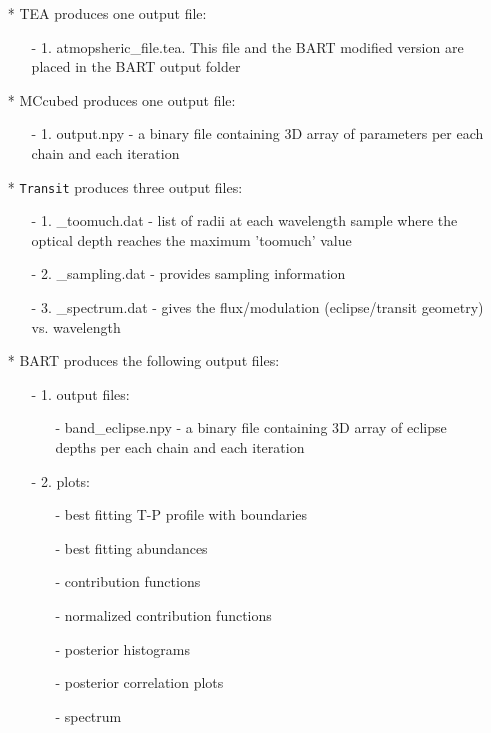 \documentclass[letterpaper, 12pt]{article}
\begin{document}
\begin{enumerate}

\item[*]TEA produces one output file:
\begin{enumerate}
\item[-]1. atmopsheric\_file.tea. This file and the BART modified version are placed in the BART output folder
\end{enumerate}

\item[*] MCcubed produces one output file:
\begin{enumerate}
\item[-]1. output.npy - a binary file containing 3D array of parameters per each chain and each iteration
\end{enumerate}

\item[*]{\tt Transit} produces three output files:
\begin{enumerate}
\item[-]1. \_toomuch.dat - list of radii at each wavelength sample where the optical depth reaches the maximum 'toomuch' value

\item[-]2. \_sampling.dat - provides sampling information 

\item[-]3. \_spectrum.dat - gives the flux/modulation (eclipse/transit geometry) vs. wavelength
\end{enumerate}

\item[*] BART produces the following output files:
\begin{enumerate}
\item[-]1. output files:
\begin{enumerate}
\item[-] band\_eclipse.npy - a binary file containing 3D array of eclipse depths per each chain and each iteration
\end{enumerate}
\item[-]2. plots:
\begin{enumerate}
\item[-] best fitting T-P profile with boundaries
\item[-] best fitting abundances
\item[-] contribution functions
\item[-] normalized contribution functions
\item[-] posterior histograms
\item[-] posterior correlation plots
\item[-] spectrum
\end{enumerate}
\end{enumerate}

\end{enumerate}
\end{document}
